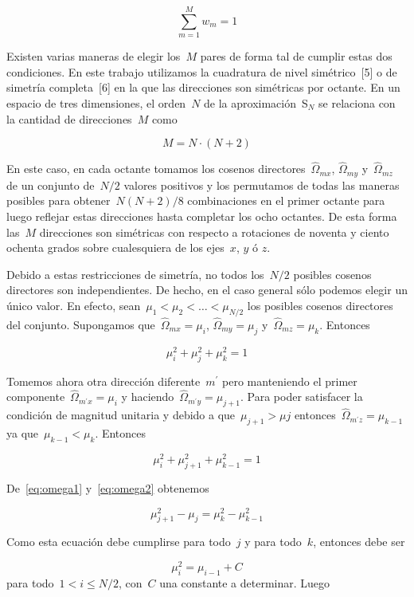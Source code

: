 \documentclass[
  12pt,
  a4paper,
  table]{scrbook}
\theoremstyle{plain}
\theoremstyle{definition}
\theoremstyle{plain}
\theoremstyle{plain}
\theoremstyle{remark}
\begin{document}
\[\label{eq:normalizacionpesos}
 \sum_{m=1}^M w_m = 1\]

Existen varias maneras de elegir los~\(M\) pares de forma tal de cumplir
estas dos condiciones. En este trabajo utilizamos la cuadratura de nivel
simétrico~{[}5{]} o de simetría completa~{[}6{]} en la que las
direcciones son simétricas por octante. En un espacio de tres
dimensiones, el orden~\(N\) de la aproximación~S\(_N\) se relaciona con
la cantidad de direcciones~\(M\) como

\[M = N\cdot(N+2)\]

En este caso, en cada octante tomamos los cosenos
directores~\(\hat{\Omega}_{mx}\), \(\hat{\Omega}_{my}\)
y~\(\hat{\Omega}_{mz}\) de un conjunto de~\(N/2\) valores positivos y
los permutamos de todas las maneras posibles para obtener~\(N(N+2)/8\)
combinaciones en el primer octante para luego reflejar estas direcciones
hasta completar los ocho octantes. De esta forma las~\(M\) direcciones
son simétricas con respecto a rotaciones de noventa y ciento ochenta
grados sobre cualesquiera de los ejes~\(x\), \(y\) ó \(z\).

Debido a estas restricciones de simetría, no todos los~\(N/2\) posibles
cosenos directores son independientes. De hecho, en el caso general sólo
podemos elegir un único valor. En efecto,
sean~\(\mu_1 < \mu_2 < \dots < \mu_{N/2}\) los posibles cosenos
directores del conjunto. Supongamos que~\(\hat{\Omega}_{mx} = \mu_i\),
\(\hat{\Omega}_{my} = \mu_j\) y~\(\hat{\Omega}_{mz} = \mu_k\). Entonces

\[\label{eq:omega1}
 \mu_i^2 + \mu_j^2 + \mu_k^2 = 1\]

Tomemos ahora otra dirección diferente~\(m^\prime\) pero manteniendo el
primer componente~\(\hat{\Omega}_{m^\prime x} = \mu_i\) y
haciendo~\(\hat{\Omega}_{m^\prime y} = \mu_{j+1}\). Para poder
satisfacer la condición de magnitud unitaria y debido a
que~\(\mu_{j+1}>\mu{j}\)
entonces~\(\hat{\Omega}_{m^\prime z} = \mu_{k-1}\) ya
que~\(\mu_{k-1}<\mu_k\). Entonces

\[\label{eq:omega2}
 \mu_i^2 + \mu_{j+1}^2 + \mu_{k-1}^2 = 1\]

De~\protect\hyperlink{eq:omega1}{{[}eq:omega1{]}}
y~\protect\hyperlink{eq:omega2}{{[}eq:omega2{]}} obtenemos

\[\mu_{j+1}^2 - \mu_{j} = \mu_{k}^2 - \mu_{k-1}^2\]

Como esta ecuación debe cumplirse para todo~\(j\) y para todo~\(k\),
entonces debe ser

\[\mu_i^2 = \mu_{i-1} + C\] para todo~\(1 < i \leq N/2\), con~\(C\) una
constante a determinar. Luego
\end{document}
